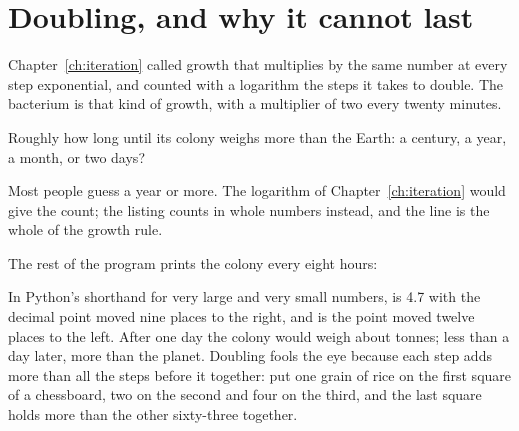 \begin{outcomes}
\end{outcomes}

\section{Doubling, and why it cannot last}
\label{sec:ch03-doubling}

\noindent
Chapter~\ref{ch:iteration} called growth that multiplies by the same number
at every step exponential, and counted with a logarithm the steps it takes
to double. The bacterium is that kind of growth, with a multiplier of two
every twenty minutes.

\begin{think}
Roughly how long until its colony weighs more than the Earth: a century, a
year, a month, or two days?
\end{think}
Most people guess a year or more. The logarithm of
Chapter~\ref{ch:iteration} would give the count; the listing counts in whole
numbers instead, and the line  is the whole of the
growth rule.


\noindent
The rest of the program prints the colony every eight hours:


\noindent
In Python's shorthand for very large and very small numbers,
 is \num{4.7} with the decimal point moved nine places to the
right, and  is the point moved twelve places to the left. After
one day the colony would weigh about  tonnes; less than
a day later, more than the planet. Doubling fools the eye because each
step adds more than all the steps before it together: put one grain of rice
on the first square of a chessboard, two on the second and four on the
third, and the last square holds more than the other sixty-three together.

